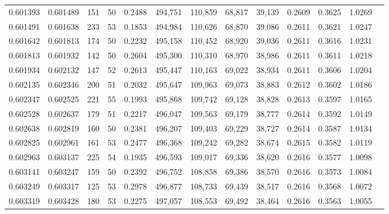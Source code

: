 \begin{tabular}{rrrrrrrrrrrrr}
0.601393 & 0.601489 &   151 &  50 &                                     0.2488 & 494,751 & 110,859 &  68,817 &  39,139 & 0.2609 & 0.3625 & 1.0269 \\
0.601491 & 0.601638 &   233 &  53 &                                     0.1853 & 494,984 & 110,626 &  68,870 &  39,086 & 0.2611 & 0.3621 & 1.0247 \\
0.601642 & 0.601813 &   174 &  50 &                                     0.2232 & 495,158 & 110,452 &  68,920 &  39,036 & 0.2611 & 0.3616 & 1.0231 \\
0.601813 & 0.601932 &   142 &  50 &                                     0.2604 & 495,300 & 110,310 &  68,970 &  38,986 & 0.2611 & 0.3611 & 1.0218 \\
0.601934 & 0.602132 &   147 &  52 &                                     0.2613 & 495,447 & 110,163 &  69,022 &  38,934 & 0.2611 & 0.3606 & 1.0204 \\
0.602135 & 0.602346 &   200 &  51 &                                     0.2032 & 495,647 & 109,963 &  69,073 &  38,883 & 0.2612 & 0.3602 & 1.0186 \\
0.602347 & 0.602525 &   221 &  55 &                                     0.1993 & 495,868 & 109,742 &  69,128 &  38,828 & 0.2613 & 0.3597 & 1.0165 \\
0.602528 & 0.602637 &   179 &  51 &                                     0.2217 & 496,047 & 109,563 &  69,179 &  38,777 & 0.2614 & 0.3592 & 1.0149 \\
0.602638 & 0.602819 &   160 &  50 &                                     0.2381 & 496,207 & 109,403 &  69,229 &  38,727 & 0.2614 & 0.3587 & 1.0134 \\
0.602825 & 0.602961 &   161 &  53 &                                     0.2477 & 496,368 & 109,242 &  69,282 &  38,674 & 0.2615 & 0.3582 & 1.0119 \\
0.602963 & 0.603137 &   225 &  54 &                                     0.1935 & 496,593 & 109,017 &  69,336 &  38,620 & 0.2616 & 0.3577 & 1.0098 \\
0.603141 & 0.603247 &   159 &  50 &                                     0.2392 & 496,752 & 108,858 &  69,386 &  38,570 & 0.2616 & 0.3573 & 1.0084 \\
0.603249 & 0.603317 &   125 &  53 &                                     0.2978 & 496,877 & 108,733 &  69,439 &  38,517 & 0.2616 & 0.3568 & 1.0072 \\
0.603319 & 0.603428 &   180 &  53 &                                     0.2275 & 497,057 & 108,553 &  69,492 &  38,464 & 0.2616 & 0.3563 & 1.0055 \\

\end{tabular}

